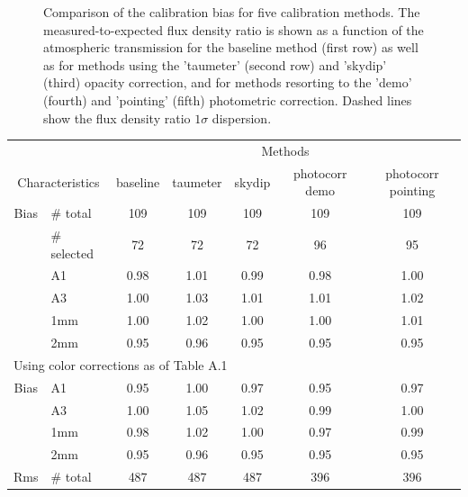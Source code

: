 \begin{figure}[ht!]
\begin{center}
    \caption[Calibration bias comparison]{Comparison of the
      calibration bias for five calibration methods. The measured-to-expected flux density ratio is shown as a
      function of the atmospheric transmission for the baseline method
      (first row) as well as for methods using the 'taumeter' (second
      row) and 'skydip' (third) opacity correction, and for methods
      resorting to the 'demo' (fourth) and 'pointing' (fifth)
      photometric correction. Dashed lines
      show the flux density ratio $1 \sigma $ dispersion.}
    \label{fig:mwc349_obstau_others}
  \end{center}
\end{figure}


\begin{table}[th]
\begin{center}
\begin{tabular}{|c|l|c|c|c|c|c|}
  \hline
  \multicolumn{2}{|c|}{}  &  \multicolumn{5}{|c|}{Methods} \\\cline{3-7}
  \multicolumn{2}{|c|}{Characteristics} &  baseline  & taumeter  &  skydip  &  photocorr demo & photocorr pointing \\
  \hline\hline
  Bias &  $\#$ total    &   109   &   109    &   109    &    109    &  109   \\
       &  $\#$ selected &    72   &   72     &    72    &     96    &   95   \\
       &  A1            &   0.98  &  1.01    &  0.99    &   0.98    &  1.00  \\
       &  A3            &   1.00  &  1.03    &  1.01    &   1.01    &  1.02  \\
       &  1mm           &   1.00  &  1.02    &  1.00    &   1.00    &  1.01  \\
       &  2mm           &   0.95  &  0.96    &  0.95    &   0.95    &  0.95  \\
  \hline
  \multicolumn{7}{|l|}{Using color corrections as of Table A.1} \\
  \hline
  Bias &  A1            &   0.95   &  1.00    &  0.97    &   0.95    &  0.97  \\
       &  A3            &   1.00   &  1.05    &  1.02    &   0.99    &  1.00  \\
       &  1mm           &   0.98   &  1.02    &  1.00    &   0.97    &  0.99  \\
       &  2mm           &   0.95   &  0.96    &  0.95    &   0.95    &  0.95  \\
  \hline
  Rms  &  $\#$ total    &   487    &    487   &    487    &    396    &  396 \\

\end{tabular}
\end{center}
\end{table}
